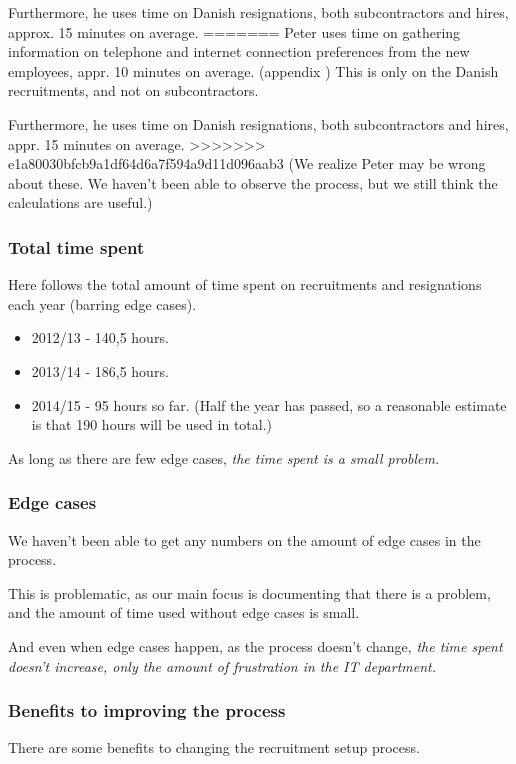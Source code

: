 Furthermore, he uses time on Danish resignations, both subcontractors and hires, approx. 15 minutes on average.
=======
Peter uses time on gathering information on telephone and internet connection preferences from the new employees, appr. 10 minutes on average.
(appendix )
This is only on the Danish recruitments, and not on subcontractors.

Furthermore, he uses time on Danish resignations, both subcontractors and hires, appr. 15 minutes on average.
>>>>>>> e1a80030bfcb9a1df64d6a7f594a9d11d096aab3
(We realize Peter may be wrong about these. We haven't been able to observe the process, but we still think the calculations are useful.)


\subsubsection{Total time spent}
Here follows the total amount of time spent on recruitments and resignations each year (barring edge cases).
\begin{itemize}
\item 2012/13 - 140,5 hours.
\item 2013/14 - 186,5 hours.
\item 2014/15 - 95 hours so far. (Half the year has passed, so a reasonable estimate is that 190 hours will be used in total.)
\end{itemize}

As long as there are few edge cases, \emph{the time spent is a small problem.}

\subsubsection{Edge cases}
We haven't been able to get any numbers on the amount of edge cases in the process.

This is problematic, as our main focus is documenting that there is a problem, and the amount of time used without edge cases is small.

And even when edge cases happen, as the process doesn't change, \emph{the time spent doesn't increase, only the amount of frustration in the IT department.}

\subsubsection{Benefits to improving the process}
There are some benefits to changing the recruitment setup process.

